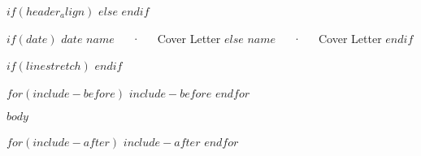 \documentclass[$if(fontsize)$$fontsize$$else$10pt$endif$,$if(lang)$$babel-lang$,$endif$$if(papersize)$$papersize$$else$a4paper$endif$,$for(classoption)$$classoption$$sep$,$endfor$]{awesomecover}
\begin{document}
$if(header_align)$
$else$
\makecvheader[R]
$endif$

$if(date)$
\makecvfooter
  {$date$}
  {$name$~~~·~~~Cover Letter}
  {}
$else$
\makecvfooter
  {}
  {$name$~~~·~~~Cover Letter}
  {}
$endif$

\makelettertitle

\begin{cvletter}

$if(linestretch)$
$endif$

$for(include-before)$
$include-before$
$endfor$

$body$

$for(include-after)$
$include-after$
$endfor$
\end{cvletter}


\makeletterclosing
\end{document}
